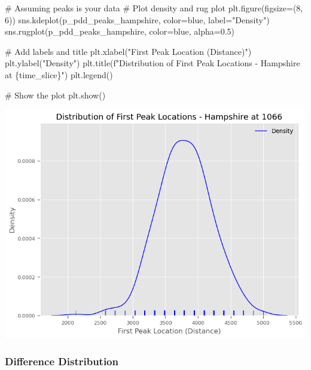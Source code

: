 \documentclass[
  11pt,
  letterpaper,
  DIV=11,
  numbers=noendperiod]{scrartcl}
\newenvironment{Shaded}{\begin{snugshade}}{\end{snugshade}}
\newcommand{\CommentTok}[1]{\textcolor[rgb]{0.37,0.37,0.37}{#1}}
\newcommand{\DecValTok}[1]{\textcolor[rgb]{0.68,0.00,0.00}{#1}}
\newcommand{\FloatTok}[1]{\textcolor[rgb]{0.68,0.00,0.00}{#1}}
\newcommand{\NormalTok}[1]{\textcolor[rgb]{0.00,0.23,0.31}{#1}}
\newcommand{\OperatorTok}[1]{\textcolor[rgb]{0.37,0.37,0.37}{#1}}
\newcommand{\SpecialCharTok}[1]{\textcolor[rgb]{0.37,0.37,0.37}{#1}}
\newcommand{\SpecialStringTok}[1]{\textcolor[rgb]{0.13,0.47,0.30}{#1}}
\newcommand{\StringTok}[1]{\textcolor[rgb]{0.13,0.47,0.30}{#1}}
\begin{document}
\begin{Shaded}
\begin{Highlighting}[]
\CommentTok{\# Assuming \textasciigrave{}peaks\textasciigrave{} is your data}
\CommentTok{\# Plot density and rug plot}
\NormalTok{plt.figure(figsize}\OperatorTok{=}\NormalTok{(}\DecValTok{8}\NormalTok{, }\DecValTok{6}\NormalTok{))}
\NormalTok{sns.kdeplot(p\_pdd\_peaks\_hampshire, color}\OperatorTok{=}\StringTok{\textquotesingle{}blue\textquotesingle{}}\NormalTok{, label}\OperatorTok{=}\StringTok{"Density"}\NormalTok{)}
\NormalTok{sns.rugplot(p\_pdd\_peaks\_hampshire, color}\OperatorTok{=}\StringTok{\textquotesingle{}blue\textquotesingle{}}\NormalTok{, alpha}\OperatorTok{=}\FloatTok{0.5}\NormalTok{)}

\CommentTok{\# Add labels and title}
\NormalTok{plt.xlabel(}\StringTok{"First Peak Location (Distance)"}\NormalTok{)}
\NormalTok{plt.ylabel(}\StringTok{"Density"}\NormalTok{)}
\NormalTok{plt.title(}\SpecialStringTok{f"Distribution of First Peak Locations {-} Hampshire at }\SpecialCharTok{\{}\NormalTok{time\_slice}\SpecialCharTok{\}}\SpecialStringTok{"}\NormalTok{)}
\NormalTok{plt.legend()}

\CommentTok{\# Show the plot}
\NormalTok{plt.show()}
\end{Highlighting}
\end{Shaded}

\includegraphics{analysis_files/figure-pdf/cell-41-output-1.png}

\subsubsection{Difference Distribution}\label{difference-distribution}
\end{document}

